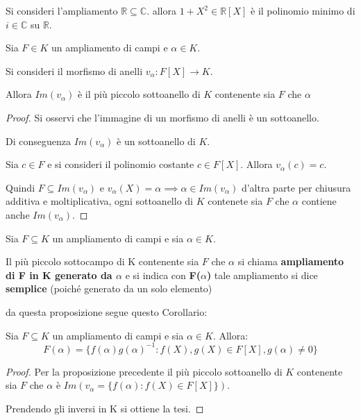\documentclass[../main.tex]{subfiles}
\begin{document}
\begin{example}
    Si consideri l'ampliamento $\mathbb{R} \subseteq \mathbb{C}$. allora $1 + X^2 \in \mathbb{R}[X]$ è il polinomio minimo di $i \in \mathbb{C}$ su $\mathbb{R}$.
\end{example}
\begin{proposition}
    Sia $F \in K$ un ampliamento di campi e $\alpha \in K$.

    Si consideri il morfismo di anelli $v_\alpha: F[X] \rightarrow K$.

    Allora $Im(v_\alpha)$ è il più piccolo sottoanello di $K$ contenente sia $F$ che $\alpha$
\end{proposition}
\begin{proof}
    Si osservi che l'immagine di un morfismo di anelli è un sottoanello.

    Di conseguenza $Im(v_\alpha)$ è un sottoanello di $K$.

    Sia $c \in F$ e si consideri il polinomio costante $c \in F[X]$. Allora $v_\alpha(c)=c$.

    Quindi $F \subseteq Im(v_\alpha)$ e $v_\alpha(X) = \alpha \implies \alpha \in Im(v_\alpha)$ d'altra parte per chiusura additiva e moltiplicativa, ogni sottoanello di $K$ contenete sia $F$ che $\alpha$ contiene anche $Im(v_\alpha)$.
\end{proof}

\begin{proposition}
    Sia $F \subseteq K$ un ampliamento di campi e sia $\alpha \in K$.

    Il più piccolo sottocampo di K contenente sia $F$ che $\alpha$ si chiama \textbf{ampliamento di F in K generato da $\alpha$} e si indica con \textbf{F($\alpha$)} tale ampliamento si dice \textbf{semplice} (poiché generato da un solo elemento)
\end{proposition}

da questa proposizione segue questo Corollario:

\begin{corollary}
    Sia $F \subseteq K$ un ampliamento di campi e sia $\alpha \in K$. Allora:
    \begin{equation*}
        F(\alpha) = \{f(\alpha)g(\alpha)^{-1} : f(X),g(X) \in F[X], g(\alpha) \neq 0\}
    \end{equation*}
\end{corollary}
\begin{proof}
    Per la proposizione precedente il più piccolo sottoanello di $K$ contenente sia $F$ che $\alpha$ è $Im(v_\alpha = \{f(\alpha) : f(X) \in F[X]\})$.

    Prendendo gli inversi in K si ottiene la tesi.
\end{proof}
\end{document}
